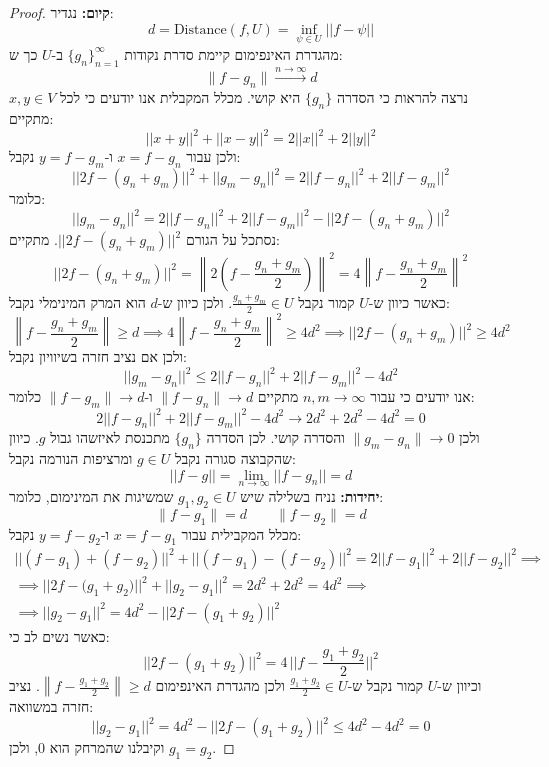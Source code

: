 \documentclass{tstextbook}
\begin{document}
\begin{proof}
\textbf{קיום:} נגדיר:
$$d= \text{Distance}(f,U)=\operatorname*{inf}_{\psi\in U}||f-\psi||$$
מהגדרת האינפימום קיימת סדרת נקודות \(\{ g_{n} \}_{n=1}^{\infty}\) ב-\(U\) כך ש:
$$\lVert f-g_{n} \rVert \xrightarrow{n\to \infty} d$$
נרצה להראות כי הסדרה \(\{ g_{n} \}\) היא קושי. מכלל המקבלית אנו יודעים כי לכל \(x,y \in V\) מתקיים:
$$||x+y||^{2}+||x-y||^{2}=2||x||^{2}+2||y||^{2}$$
ולכן עבור \(x=f-g_{n}\) ו-\(y=f-g_{m}\) נקבל:
$$||2f-(g_{n}+g_{m})||^{2}+||g_{m}-g_{n}||^{2}=2||f-g_{n}||^{2}+2||f-g_{m}||^{2}$$
כלומר:
$$||g_{m}-g_{n}||^{2}=2||f-g_{n}||^{2}+2||f-g_{m}||^{2}-||2f-\left(g_{n}+g_{m}\right)||^{2}$$
נסתכל על הגורם \(||2f-\left(g_{n}+g_{m}\right)||^{2}\). מתקיים:
$$||2f-(g_{n}+g_{m})||^{2}=\left\|2\left(f-{\frac{g_{n}+g_{m}}{2}}\right)\right\|^{2}=4\left\|f-{\frac{g_{n}+g_{m}}{2}}\right\|^{2}$$
כאשר כיוון ש-\(U\) קמור נקבל \(\frac{g_{n}+g_{m}}{2}\in U\). ולכן כיוון ש-\(d\) הוא המרק המינימלי נקבל:
$$\left\|f-{\frac{g_{n}+g_{m}}{2}}\right\|\geq d\implies4\left\|f-{\frac{g_{n}+g_{m}}{2}}\right\|^{2}\geq4d^{2}\implies||2f-(g_{n}+g_{m})||^{2}\geq4d^{2}$$
ולכן אם נציב חזרה בשיוויון נקבל:
$$||g_{m}-g_{n}||^{2}\leq2||f-g_{n}||^{2}+2||f-g_{m}||^{2}-4d^{2}$$
אנו יודעים כי עבור \(n,m\to \infty\) מתקיים \(\lVert f-g_{n} \rVert\to d\) ו-\(\lVert f-g_{m} \rVert\to d\) כלומר:
$$2||f-g_{n}||^{2}+2||f-g_{m}||^{2}-4d^{2}\to2d^{2}+2d^{2}-4d^{2}=0$$
ולכן \(\lVert g_{m}-g_{n} \rVert\to 0\) והסדרה קושי. לכן הסדרה \(\{ g_{n} \}\) מתכנסת לאיזשהו גבול \(g\). כיוון שהקבוצה סגורה נקבל \(g \in U\) ומרציפות הנורמה נקבל:
$$||f-g||=\operatorname*{lim}_{n\to\infty}||f-g_{n}||=d$$\textbf{יחידות:}
נניח בשלילה שיש \(g_{1},g_{2} \in U\) שמשיגות את המינימום, כלומר:
$$\lVert f-g_{1} \rVert=d\qquad \lVert f-g_{2} \rVert=d$$
מכלל המקבילית עבור \(x=f-g_{1}\) ו-\(y=f-g_{2}\) נקבל:
\begin{gather*}||(f-g_{1})+(f-g_{2})||^{2}+||(f-g_{1})-(f-g_{2})||^{2}=2||f-g_{1}||^{2}+2||f-g_{2}||^{2}\implies\\\implies||2f-{\big(}g_{1}+g_{2}{\big)}||^{2}+||g_{2}-g_{1}||^{2}=2d^{2}+2d^{2}=4d^{2}\implies \\ \implies ||g_{2}-g_{1}||^{2}=4d^{2}-||2f-(g_{1}+g_{2})||^{2}
\end{gather*}
כאשר נשים לב כי:
$$||2f-(g_{1}+g_{2})||^{2}=4\,||f-{\textstyle\frac{g_{1}+g_{2}}{2}}||^{2}$$
וכיוון ש-\(U\) קמור נקבל ש-\(\frac{g_{1}+g_{2}}{2}\in U\) ולכן מהגדרת האינפימום \(\left\|f-{\frac{g_{1}+g_{2}}{2}}\right\|\geq d\). נציב חזרה במשוואה:
$$||g_{2}-g_{1}||^{2}=4d^{2}-||2f-(g_{1}+g_{2})||^{2}\leq4d^{2}-4d^{2}=0$$
וקיבלנו שהמרחק הוא 0, ולכן \(g_{1}=g_{2}\).

\end{proof}
\end{document}
